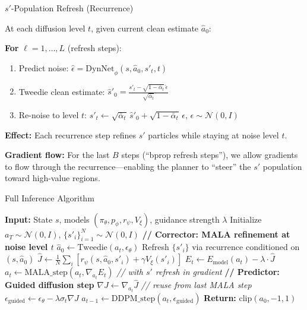 \documentclass[aspectratio=169]{beamer}
\begin{document}
\begin{frame}{$s'$-Population Refresh (Recurrence)}

At each diffusion level $t$, given current clean estimate $\hat{a}_0$:

\vspace{0.5em}
\textbf{For} $\ell = 1, \ldots, L$ (refresh steps):
\begin{enumerate}
    \item Predict noise: $\hat{\epsilon} = \text{DynNet}_\phi(s, \hat{a}_0, s'_t, t)$
    \item Tweedie clean estimate: $\hat{s}'_0 = \frac{s'_t - \sqrt{1-\bar{\alpha}_t}\,\hat{\epsilon}}{\sqrt{\bar{\alpha}_t}}$
    \item Re-noise to level $t$: $s'_t \gets \sqrt{\bar{\alpha}_t}\,\hat{s}'_0 + \sqrt{1-\bar{\alpha}_t}\,\epsilon$, \quad $\epsilon \sim \mathcal{N}(0,I)$
\end{enumerate}

\vspace{0.5em}
\textbf{Effect:} Each recurrence step refines $s'$ particles while staying at noise level $t$.

\vspace{0.5em}
\textbf{Gradient flow:} For the last $B$ steps (``bprop refresh steps''), we allow gradients to flow through the recurrence---enabling the planner to ``steer'' the $s'$ population toward high-value regions.

\end{frame}

\begin{frame}{Full Inference Algorithm}

\begin{algorithmic}[1]
\small
\STATE \textbf{Input:} State $s$, models $(\pi_\theta, p_\phi, r_\psi, V_\xi)$, guidance strength $\lambda$
\STATE Initialize $a_T \sim \mathcal{N}(0, I)$, \; $\{s'_i\}_{i=1}^N \sim \mathcal{N}(0, I)$
    \STATE \textcolor{softblue}{\textbf{// Corrector: MALA refinement at noise level $t$}}
        \STATE $\hat{a}_0 \gets \text{Tweedie}(a_t, \epsilon_\theta)$
        \STATE Refresh $\{s'_i\}$ via recurrence conditioned on $(s, \hat{a}_0)$
        \STATE $\hat{J} \gets \frac{1}{N}\sum_i [r_\psi(s, \hat{a}_0, s'_i) + \gamma V_\xi(s'_i)]$
        \STATE $E_t \gets E_{\text{model}}(a_t) - \lambda \cdot \hat{J}$
        \STATE $a_t \gets \text{MALA\_step}(a_t, \nabla_{a_t} E_t)$ \hfill \textit{// with $s'$ refresh in gradient}
    \ENDFOR
    \STATE \textcolor{softorange}{\textbf{// Predictor: Guided diffusion step}}
    \STATE $\nabla J \gets \nabla_{a_t} \hat{J}$ \hfill \textit{// reuse from last MALA step}
    \STATE $\epsilon_{\text{guided}} \gets \epsilon_\theta - \lambda \sigma_t \nabla J$
    \STATE $a_{t-1} \gets \text{DDPM\_step}(a_t, \epsilon_{\text{guided}})$
\ENDFOR
\STATE \textbf{Return:} $\text{clip}(a_0, -1, 1)$
\end{algorithmic}

\end{frame}
\end{document}
